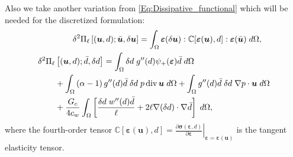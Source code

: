 Also we take another variation from \eqref{Eq:Dissipative_functional} which will be needed for the discretized formulation:
\begin{subequations}\label{Eq:Tangent}
\begin{align}\label{Eq:Tangent_u}
\begin{split}
        \delta^2 \Pi_\ell & \left[(\bm{u}, d); \bar{\bm{u}}, \delta \bm{u}\right]
        = \int_\Omega \bm{\varepsilon}(\delta\bm{u}): \mathbb{C}[\bm{\varepsilon}(\bm{u}), d] : \bm{\varepsilon}(\bar{\bm{u}})  \;d\Omega,
        \end{split}\\
        \begin{split}
	            \delta^2 \Pi_\ell & \left[(\bm{u}, d);  \bar{d},  \delta d\right]
	    =  \int_\Omega \delta d \;g''(d) \psi_+(\bm{\varepsilon}) \bar d \; d\Omega\\ 
	    & +\int_{\Omega} \left(\alpha-1\right) g''(d)\bar{d} \; \delta d \; {p} \operatorname{div} {{\bm{u}}} \; d\Omega +\int_{\Omega}  g''(d)\bar{d} \; \delta d \; \nabla {p} \cdot {{\bm{u}}} \; d\Omega 
	    \\& +
	    \frac{G_c}{4c_w} \int_\Omega  \left[\frac{\delta d \; w''(d) \bar{d}}{\ell} + 2\ell \nabla (\delta d) \cdot \nabla \bar d \right]\;d\Omega,
	    \end{split}
\end{align}
\end{subequations}
where the fourth-order tensor $\mathbb{C}[\bm{\varepsilon}(\bm{u}), d] = \left.\frac{\partial \bm{\sigma}(\bm{\varepsilon}, d)}{\partial \bm{\varepsilon}}\right|_{\bm{\varepsilon}=\bm{\varepsilon}(\bm{u})}$ is the tangent elasticity tensor.

